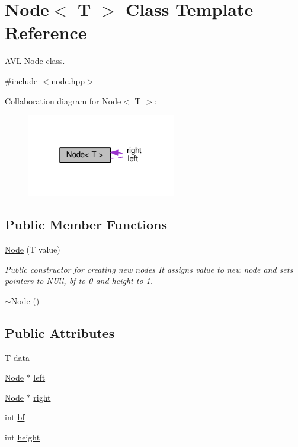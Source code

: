 \hypertarget{class_node}{}\section{Node$<$ T $>$ Class Template Reference}
\label{class_node}


A\+VL \hyperlink{class_node}{Node} class.  




{\ttfamily \#include $<$node.\+hpp$>$}



Collaboration diagram for Node$<$ T $>$\+:
\nopagebreak
\begin{figure}[H]
\begin{center}
\leavevmode
\includegraphics[width=184pt]{class_node__coll__graph}
\end{center}
\end{figure}
\subsection*{Public Member Functions}
\begin{DoxyCompactItemize}
\item 
\hyperlink{class_node_aa72a44d0679a17d33d7a6f2b41790125}{Node} (T value)
\begin{DoxyCompactList}\small\item\em Public constructor for creating new nodes It assigns value to new node and sets pointers to N\+Ull, bf to 0 and height to 1. \end{DoxyCompactList}\item 
\hyperlink{class_node_ae923d0417581dd19784d55b901f0f7f0}{$\sim$\+Node} ()
\end{DoxyCompactItemize}
\subsection*{Public Attributes}
\begin{DoxyCompactItemize}
\item 
T \hyperlink{class_node_ac450c71a8677a38d306361f9ced518d3}{data}
\item 
\hyperlink{class_node}{Node} $\ast$ \hyperlink{class_node_a6596c7ac17ecafff5522310c0da3a828}{left}
\item 
\hyperlink{class_node}{Node} $\ast$ \hyperlink{class_node_a4009a1138f2f04372037fbec63406f11}{right}
\item 
int \hyperlink{class_node_aaf22ddd5e77fcf19eab893bb58924158}{bf}
\item 
int \hyperlink{class_node_a15b477d75fdc30cac4847dab9c954568}{height}
\end{DoxyCompactItemize}



